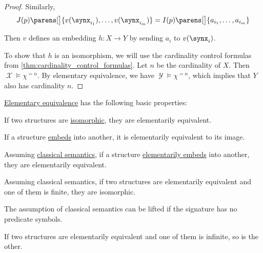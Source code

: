 \begin{proof}
  Similarly,
  \begin{equation*}
    J(p)\parens[\big]{ v(\synx_{i_1}), \ldots, v(\synx_{i_m}) } = I(p)\parens[\big]{ a_{i_1}, \ldots, a_{i_m} }
  \end{equation*}

  Then \( v \) defines an embedding \( h: X \to Y \) by sending \( a_i \) to \( v(\synx_i) \).

  To show that \( h \) is an isomorphism, we will use the cardinality control formulas from \cref{thm:cardinality_control_formulas}. Let \( n \) be the cardinality of \( X \). Then \( \mscrX \vDash \chi^{=n} \). By elementary equivalence, we have \( \mscrY \vDash \chi^{=n} \), which implies that \( Y \) also has cardinality \( n \).
\end{proof}

\begin{proposition}\label{thm:def:elementary_equivalence}
  \hyperref[def:elementary_equivalence]{Elementary equivalence} has the following basic properties:
  \begin{thmenum}
     If two structures are \hyperref[def:fol_isomorphism]{isomorphic}, they are elementarily equivalent.

     If a structure \hyperref[def:fol_monomorphism]{embeds} into another, it is elementarily equivalent to its image.

     Assuming \hyperref[def:truth_value_algebra/classical]{classical semantics}, if a structure \hyperref[def:elementary_embedding]{elementarily embeds} into another, they are elementarily equivalent.

     Assuming classical semantics, if two structures are elementarily equivalent and one of them is finite, they are isomorphic.

    The assumption of classical semantics can be lifted if the signature has no predicate symbols.

     If two structures are elementarily equivalent and one of them is infinite, so is the other.
  \end{thmenum}
\end{proposition}
